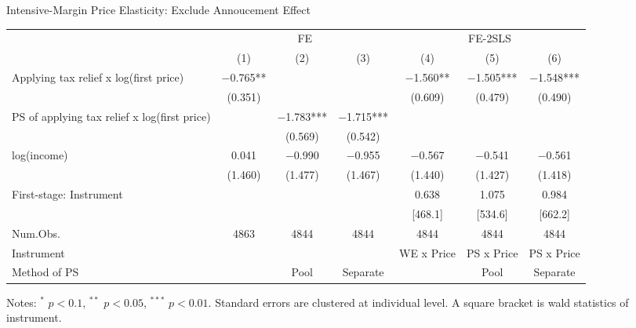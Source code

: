 \documentclass[
  ignorenonframetext,
  aspectratio=169,
]{beamer}
\begin{document}
\begin{frame}{Intensive-Margin Price Elasticity: Exclude Annoucement Effect}
\protect\hypertarget{intensive-margin-price-elasticity-exclude-annoucement-effect}{}
\begin{table}[!h]
\centering
\fontsize{8}{10}\selectfont
\begin{threeparttable}
\begin{tabular}[t]{>{\raggedright\arraybackslash}p{10em}cccccc}
\toprule
\multicolumn{1}{c}{ } & \multicolumn{3}{c}{FE} & \multicolumn{3}{c}{FE-2SLS} \\
\cmidrule(l{3pt}r{3pt}){2-4} \cmidrule(l{3pt}r{3pt}){5-7}
  & (1) & (2) & (3) & (4) & (5) & (6)\\
\midrule
Applying tax relief x log(first price) & \num{-0.765}** &  &  & \num{-1.560}** & \num{-1.505}*** & \num{-1.548}***\\
 & (\num{0.351}) &  &  & (\num{0.609}) & (\num{0.479}) & (\num{0.490})\\
PS of applying tax relief x log(first price) &  & \num{-1.783}*** & \num{-1.715}*** &  &  & \\
 &  & (\num{0.569}) & (\num{0.542}) &  &  & \\
log(income) & \num{0.041} & \num{-0.990} & \num{-0.955} & \num{-0.567} & \num{-0.541} & \num{-0.561}\\
 & (\num{1.460}) & (\num{1.477}) & (\num{1.467}) & (\num{1.440}) & (\num{1.427}) & (\num{1.418})\\
\midrule
First-stage: Instrument &  &  &  & 0.638 & 1.075 & 0.984\\
 &  &  &  & {}[468.1] & {}[534.6] & {}[662.2]\\
Num.Obs. & \num{4863} & \num{4844} & \num{4844} & \num{4844} & \num{4844} & \num{4844}\\
Instrument &  &  &  & WE x Price & PS x Price & PS x Price\\
Method of PS &  & Pool & Separate &  & Pool & Separate\\
\bottomrule
\end{tabular}
\begin{tablenotes}
\item Notes: $^{*}$ $p < 0.1$, $^{**}$ $p < 0.05$, $^{***}$ $p < 0.01$. Standard errors are clustered at individual level. A square bracket is wald statistics of instrument.
\end{tablenotes}
\end{threeparttable}
\end{table}
\end{frame}
\end{document}
